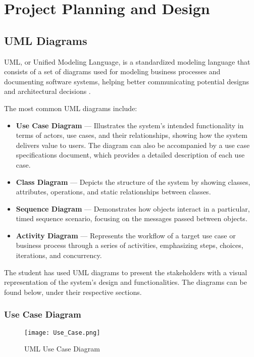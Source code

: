\chapter{Project Planning and Design}

\section{UML Diagrams}

UML, or Unified Modeling Language, is a standardized modeling language that consists of a set of diagrams used for modeling business processes and documenting software systems, helping better communicating potential designs and architectural decisions \parencite{uml}. 

The most common UML diagrams include:
\begin{itemize}
    \item \textbf{Use Case Diagram} --- Illustrates the system's intended functionality in terms of actors, use cases, and their relationships, showing how the system delivers value to users. The diagram can also be accompanied by a use case specifications document, which provides a detailed description of each use case.
    \item \textbf{Class Diagram} --- Depicts the structure of the system by showing classes, attributes, operations, and static relationships between classes.
    \item \textbf{Sequence Diagram} --- Demonstrates how objects interact in a particular, timed sequence scenario, focusing on the messages passed between objects.
    \item \textbf{Activity Diagram} --- Represents the workflow of a target use case or business process through a series of activities, emphasizing steps, choices, iterations, and concurrency.
\end{itemize}

The student has used UML diagrams to present the stakeholders with a visual representation of the system's design and functionalities. The diagrams can be found below, under their respective sections.

\subsection{Use Case Diagram}
\begin{figure}[htbp]
    \centering
    \texttt{[image: Use\_Case.png]}
    \caption{UML Use Case Diagram}\label{fig:uml_usecase}
\end{figure}

